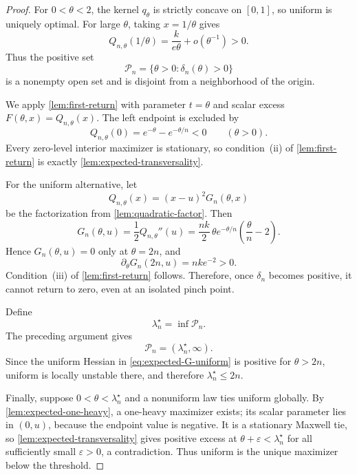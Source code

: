 \documentclass[11pt]{article}
\theoremstyle{plain}
\theoremstyle{definition}
\theoremstyle{remark}
\begin{document}
\begin{proof}
For \(0<\theta<2\), the kernel \(q_\theta\) is strictly concave on \([0,1]\), so uniform is uniquely optimal.  For large \(\theta\), taking \(x=1/\theta\) gives
\[
Q_{n,\theta}(1/\theta)=\frac{k}{e\theta}+o(\theta^{-1})>0.
\]
Thus the positive set
\[
\mathcal P_n=\{\theta>0:\delta_n(\theta)>0\}
\]
is a nonempty open set and is disjoint from a neighborhood of the origin.

We apply \cref{lem:first-return} with parameter \(t=\theta\) and scalar excess \(F(\theta,x)=Q_{n,\theta}(x)\).  The left endpoint is excluded by
\[
Q_{n,\theta}(0)=e^{-\theta}-e^{-\theta/n}<0
\qquad(\theta>0).
\]
Every zero-level interior maximizer is stationary, so condition~\textup{(ii)} of \cref{lem:first-return} is exactly \cref{lem:expected-transversality}.

For the uniform alternative, let
\[
Q_{n,\theta}(x)=(x-u)^2G_n(\theta,x)
\]
be the factorization from \cref{lem:quadratic-factor}.  Then
\begin{equation}\label{eq:expected-G-uniform}
G_n(\theta,u)
=\frac12Q_{n,\theta}''(u)
=\frac{nk}{2}\,\theta e^{-\theta/n}
\left(\frac\theta n-2\right).
\end{equation}
Hence \(G_n(\theta,u)=0\) only at \(\theta=2n\), and
\begin{equation}\label{eq:expected-G-orientation}
\partial_\theta G_n(2n,u)=nk e^{-2}>0.
\end{equation}
Condition~\textup{(iii)} of \cref{lem:first-return} follows.  Therefore, once \(\delta_n\) becomes positive, it cannot return to zero, even at an isolated pinch point.

Define
\[
\lambda_n^\star=\inf\mathcal P_n.
\]
The preceding argument gives
\[
\mathcal P_n=(\lambda_n^\star,\infty).
\]
Since the uniform Hessian in \eqref{eq:expected-G-uniform} is positive for \(\theta>2n\), uniform is locally unstable there, and therefore \(\lambda_n^\star\le2n\).

Finally, suppose \(0<\theta<\lambda_n^\star\) and a nonuniform law ties uniform globally.  By \cref{lem:expected-one-heavy}, a one-heavy maximizer exists; its scalar parameter lies in \((0,u)\), because the endpoint value is negative.  It is a stationary Maxwell tie, so \cref{lem:expected-transversality} gives positive excess at \(\theta+\varepsilon<\lambda_n^\star\) for all sufficiently small \(\varepsilon>0\), a contradiction.  Thus uniform is the unique maximizer below the threshold.
\end{proof}
\end{document}
